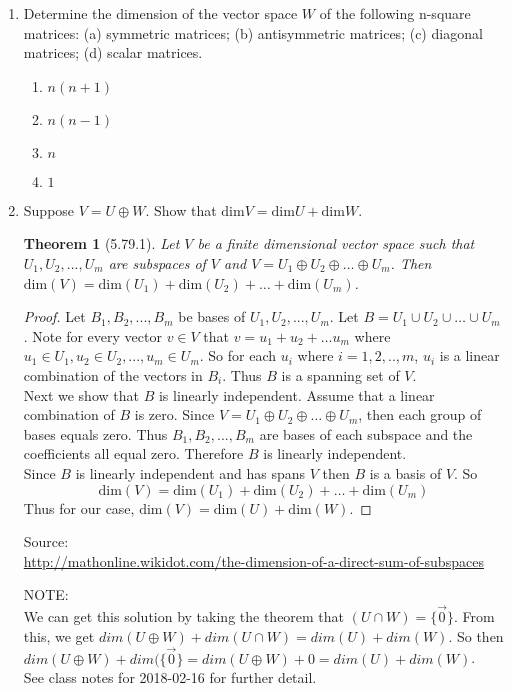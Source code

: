 \documentclass[12pt]{article}
\newtheorem*{theorem}{Theorem} %
\begin{document}
\begin{enumerate}
\item[5.82] Determine the dimension of the vector space $W$ of the following n-square matrices: (a) symmetric matrices; (b) antisymmetric matrices; (c) diagonal matrices; (d) scalar matrices.
	\begin{enumerate}
	\item $n(n+1)$
	\item $n(n-1)$
	\item $n$
	\item $1$
	\end{enumerate}
	
\item[5.79] Suppose $V=U\oplus W$. Show that $\mathrm{dim}V=\mathrm{dim}U+\mathrm{dim}W$.
	\begin{theorem}[5.79.1]
	Let $V$ be a finite dimensional vector space such that $U_1,U_2,...,U_m$ are subspaces of $V$ and $V=U_1\oplus U_2\oplus \dots \oplus U_m$. Then $\mathrm{dim}(V) = \mathrm{dim}(U_1)+\mathrm{dim}(U_2)+\dots+\mathrm{dim}(U_m)$.
	\end{theorem}
	\begin{proof}
	Let $B_1,B_2,...,B_m$ be bases of $U_1,U_2,...,U_m$. Let $B=U_1\cup U_2\cup \dots \cup U_m$. Note for every vector $v\in V$ that $v=u_1+u_2+\dots u_m$ where $u_1\in U_1,u_2\in U_2,...,u_m\in U_m$. So for each $u_i$ where $i=1,2,..,m$, $u_i$ is a linear combination of the vectors in $B_i$. Thus $B $ is a spanning set of $V$.\\
	Next we show that $B$ is linearly independent. Assume that a linear combination of $B$ is zero. Since $V=U_1\oplus U_2 \oplus \dots \oplus U_m$, then each group of bases equals zero. Thus $B_1,B_2,...,B_m$ are bases of each subspace and the coefficients all equal zero. Therefore $B$ is linearly independent.\\
	Since $B$ is linearly independent and has spans $V$ then $B$ is a basis of $V$. So
	\[ \mathrm{dim}(V) = \mathrm{dim}(U_1)+\mathrm{dim}(U_2)+\dots +\mathrm{dim}(U_m) \]
	Thus for our case, $\mathrm{dim}(V) = \mathrm{dim}(U) + \mathrm{dim}(W)$.
	\end{proof}
	Source:\\
	\url{http://mathonline.wikidot.com/the-dimension-of-a-direct-sum-of-subspaces}
	
	NOTE:\\
	We can get this solution by taking the theorem that $(U\cap W) = \{\vec{0}\}$. From this, we get $dim(U\oplus W) + dim(U\cap W) = dim(U) + dim(W)$. So then $dim(U\oplus W) + dim(\{\vec{0}\} = dim(U\oplus W) + 0 = dim(U)+dim(W)$.\\
	See class notes for 2018-02-16 for further detail.
\end{enumerate}
\end{document}
